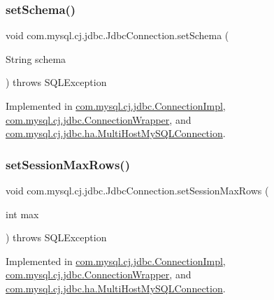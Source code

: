 \subsubsection{\texorpdfstring{set\+Schema()}{setSchema()}}
{\footnotesize\ttfamily void com.\+mysql.\+cj.\+jdbc.\+Jdbc\+Connection.\+set\+Schema (\begin{DoxyParamCaption}\item[{String}]{schema }\end{DoxyParamCaption}) throws S\+Q\+L\+Exception}



Implemented in \mbox{\hyperlink{classcom_1_1mysql_1_1cj_1_1jdbc_1_1_connection_impl_a33c175b4c5e5e8fe812a28d24ea180e2}{com.\+mysql.\+cj.\+jdbc.\+Connection\+Impl}}, \mbox{\hyperlink{classcom_1_1mysql_1_1cj_1_1jdbc_1_1_connection_wrapper_aab033f6e889c46495c2b6bff7705d5ae}{com.\+mysql.\+cj.\+jdbc.\+Connection\+Wrapper}}, and \mbox{\hyperlink{classcom_1_1mysql_1_1cj_1_1jdbc_1_1ha_1_1_multi_host_my_s_q_l_connection_a681cee77f07b3459af4f090b6f41df91}{com.\+mysql.\+cj.\+jdbc.\+ha.\+Multi\+Host\+My\+S\+Q\+L\+Connection}}.

\mbox{\label{interfacecom_1_1mysql_1_1cj_1_1jdbc_1_1_jdbc_connection_aec5eb42d9facdbd97b0a5238022af05d}} 
\subsubsection{\texorpdfstring{set\+Session\+Max\+Rows()}{setSessionMaxRows()}}
{\footnotesize\ttfamily void com.\+mysql.\+cj.\+jdbc.\+Jdbc\+Connection.\+set\+Session\+Max\+Rows (\begin{DoxyParamCaption}\item[{int}]{max }\end{DoxyParamCaption}) throws S\+Q\+L\+Exception}



Implemented in \mbox{\hyperlink{classcom_1_1mysql_1_1cj_1_1jdbc_1_1_connection_impl_ae55ba5618d7116e5db7ac647ab771087}{com.\+mysql.\+cj.\+jdbc.\+Connection\+Impl}}, \mbox{\hyperlink{classcom_1_1mysql_1_1cj_1_1jdbc_1_1_connection_wrapper_aa601c614b388b25f9d840ed1e776cd89}{com.\+mysql.\+cj.\+jdbc.\+Connection\+Wrapper}}, and \mbox{\hyperlink{classcom_1_1mysql_1_1cj_1_1jdbc_1_1ha_1_1_multi_host_my_s_q_l_connection_aa6b6cf327eb089f3de4c86b9e061278c}{com.\+mysql.\+cj.\+jdbc.\+ha.\+Multi\+Host\+My\+S\+Q\+L\+Connection}}.


